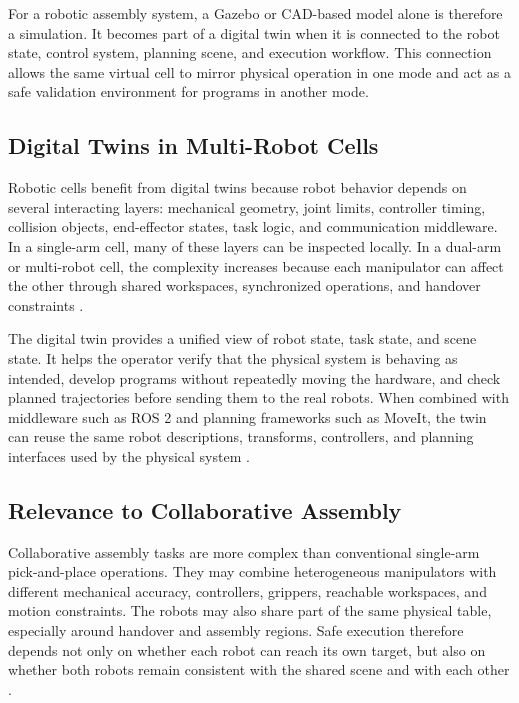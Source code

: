 For a robotic assembly system, a Gazebo or CAD-based model alone is therefore a simulation. It becomes part of a digital twin when it is connected to the robot state, control system, planning scene, and execution workflow. This connection allows the same virtual cell to mirror physical operation in one mode and act as a safe validation environment for programs in another mode.

\subsection{Digital Twins in Multi-Robot Cells}

Robotic cells benefit from digital twins because robot behavior depends on several interacting layers: mechanical geometry, joint limits, controller timing, collision objects, end-effector states, task logic, and communication middleware. In a single-arm cell, many of these layers can be inspected locally. In a dual-arm or multi-robot cell, the complexity increases because each manipulator can affect the other through shared workspaces, synchronized operations, and handover constraints \cite{matheson2019human,kruger2009cooperation}.

The digital twin provides a unified view of robot state, task state, and scene state. It helps the operator verify that the physical system is behaving as intended, develop programs without repeatedly moving the hardware, and check planned trajectories before sending them to the real robots. When combined with middleware such as ROS 2 and planning frameworks such as MoveIt, the twin can reuse the same robot descriptions, transforms, controllers, and planning interfaces used by the physical system \cite{macenski2022robot,coleman2014reducing}.

\subsection{Relevance to Collaborative Assembly}

Collaborative assembly tasks are more complex than conventional single-arm pick-and-place operations. They may combine heterogeneous manipulators with different mechanical accuracy, controllers, grippers, reachable workspaces, and motion constraints. The robots may also share part of the same physical table, especially around handover and assembly regions. Safe execution therefore depends not only on whether each robot can reach its own target, but also on whether both robots remain consistent with the shared scene and with each other \cite{michalos2015design,erdmann1987multiple}.


